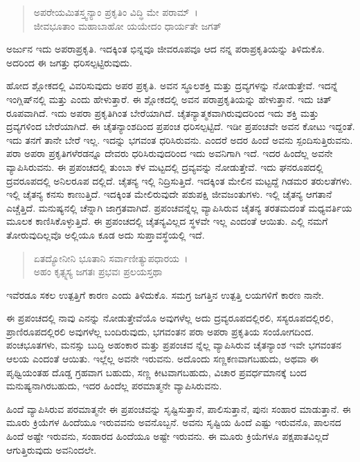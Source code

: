 \begin{verse}
ಅಪರೇಯಮಿತಸ್ತ್ವನ್ಯಾಂ ಪ್ರಕೃತಿಂ ವಿದ್ಧಿ ಮೇ ಪರಾಮ್~।\\ಜೀವಭೂತಾಂ ಮಹಾಬಾಹೋ ಯಯೇದಂ ಧಾರ್ಯತೇ ಜಗತ್ 
\end{verse}

{\small ಅರ್ಜುನ ಇದು ಅಪರಾಪ್ರಕೃತಿ. ಇದಕ್ಕಿಂತ ಭಿನ್ನವೂ ಜೀವರೂಪವೂ ಆದ ನನ್ನ ಪರಾಪ್ರಕೃತಿಯನ್ನು ತಿಳಿದುಕೊ. ಅದರಿಂದ ಈ ಜಗತ್ತು ಧರಿಸಲ್ಪಟ್ಟಿರುವುದು.}

ಹೋದ ಶ್ಲೋಕದಲ್ಲಿ ವಿವರಿಸುವುದು ಅಪರ ಪ್ರಕೃತಿ. ಅವನ ಸ್ಥೂಲಶಕ್ತಿ ಮತ್ತು ದ್ರವ್ಯಗಳನ್ನು ನೋಡುತ್ತೇವೆ. ಇದನ್ನೆ ಇಂಗ್ಲಿಷ್​ನಲ್ಲಿ  ಮತ್ತು  ಎಂದು ಹೇಳುತ್ತಾರೆ. ಈ ಶ್ಲೋಕದಲ್ಲಿ ಅವನ ಪರಾಪ್ರಕೃತಿಯನ್ನು ಹೇಳುತ್ತಾನೆ. ಇದು ಚಿತ್​ರೂಪವಾಗಿದೆ. ಇದು ಅಪರಾ ಪ್ರಕೃತಿಗಿಂತ ಬೇರೆಯಾಗಿದೆ. ಚೈತನ್ಯಾತ್ಮಕವಾಗಿರುವುದರಿಂದ ಇದು ಶಕ್ತಿ ಮತ್ತು ದ್ರವ್ಯಗಳಿಂದ ಬೇರೆಯಾಗಿದೆ. ಈ ಚೈತನ್ಯಾಂಶದಿಂದ ಪ್ರಪಂಚ ಧರಿಸಲ್ಪಟ್ಟಿದೆ. ಇಡೀ ಪ್ರಪಂಚವೇ ಅವನ ಕೋಟು ಇದ್ದಂತೆ. ಇದು ತನಗೆ ತಾನೇ ಬೇರೆ ಇಲ್ಲ. ಇದನ್ನು ಭಗವಂತ ಧರಿಸಿರುವನು. ಎಂದರೆ ಅದರ ಹಿಂದೆ ಅವನು ಸ್ಪಂದಿಸುತ್ತಿರುವನು. ಪರಾ ಅಪರಾ ಪ್ರಕೃತಿಗಳೆರಡನ್ನೂ ದೇವರು ಧರಿಸಿರುವುದರಿಂದ ಇದು ಅವನಿಗಾಗಿ ಇದೆ. ಇದರ ಹಿಂದೆಲ್ಲ ಅವನೇ ವ್ಯಾಪಿಸಿರುವನು. ಈ ಪ್ರಪಂಚದಲ್ಲಿ ತುಂಬಾ ಕೆಳ ಮಟ್ಟದಲ್ಲಿ ದ್ರವ್ಯವನ್ನು ನೋಡುತ್ತೇವೆ. ಇದು ಘನರೂಪದಲ್ಲಿ ದ್ರವರೂಪದಲ್ಲಿ ಅನಿಲರೂಪ ದಲ್ಲಿದೆ. ಚೈತನ್ಯ ಇಲ್ಲಿ ನಿದ್ರಿಸುತ್ತಿದೆ. ಇದಕ್ಕಿಂತ ಮೇಲಿನ ಮಟ್ಟದ್ದೆ ಗಿಡಮರ ತರುಲತೆಗಳು. ಇಲ್ಲಿ ಚೈತನ್ಯ ಕನಸು ಕಾಣುತ್ತಿದೆ. ಇದಕ್ಕಿಂತ ಮೇಲಿರುವುದೇ ಪಶುಪಕ್ಷಿ ಜೀವಜಂತುಗಳು. ಇಲ್ಲಿ ಚೈತನ್ಯ ಆಗತಾನೆ ಎಚ್ಚೆತ್ತಿದೆ. ಮನುಷ್ಯನಲ್ಲಿ ಚೆನ್ನಾಗಿ ಜಾಗ್ರತವಾಗಿದೆ. ಪ್ರಪಂಚವನ್ನೆಲ್ಲ ವ್ಯಾಪಿಸಿರುವ ಚೈತನ್ಯ ತರತಮದಂತೆ ಮಧ್ಯವರ್ತಿಯ ಮೂಲಕ ಕಾಣಿಸಿಕೊಳ್ಳುತ್ತಿದೆ. ಈ ಪ್ರಪಂಚದಲ್ಲಿ ಚೈತನ್ಯವಿಲ್ಲದ ಸ್ಥಳವೇ ಇಲ್ಲ ಎಂದಂತೆ ಆಯಿತು. ಎಲ್ಲಿ ನಮಗೆ ತೋರುವುದಿಲ್ಲವೊ ಅಲ್ಲಿಯೂ ಕೂಡ ಅದು ಸುಪ್ತಾವಸ್ಥೆಯಲ್ಲಿ ಇದೆ.

\begin{verse}
ಏತದ್ಯೋನೀನಿ ಭೂತಾನಿ ಸರ್ವಾಣೀತ್ಯುಪಧಾರಯ~।\\ಅಹಂ ಕೃತ್ಸ್ನಸ್ಯ ಜಗತಃ ಪ್ರಭವಃ ಪ್ರಲಯಸ್ತಥಾ 
\end{verse}

{\small ಇವೆರಡೂ ಸಕಲ ಉತ್ಪತ್ತಿಗೆ ಕಾರಣ ಎಂದು ತಿಳಿದುಕೊ. ಸಮಗ್ರ ಜಗತ್ತಿನ ಉತ್ಪತ್ತಿ ಲಯಗಳಿಗೆ ಕಾರಣ ನಾನೇ.}

ಈ ಪ್ರಪಂಚದಲ್ಲಿ ನಾವು ಎನನ್ನು ನೋಡುತ್ತೇವೆಯೊ ಅವುಗಳೆಲ್ಲ ಅದು ದ್ರವ್ಯರೂಪದಲ್ಲಿರಲಿ, ಸಸ್ಯರೂಪದಲ್ಲಿರಲಿ, ಪ್ರಾಣಿರೂಪದಲ್ಲಿರಲಿ ಅವುಗಳೆಲ್ಲ ಬಂದಿರುವುದು, ಭಗವಂತನ ಪರಾ ಅಪರಾ ಪ್ರಕೃತಿಯ ಸಂಯೋಗದಿಂದ. ಪಂಚಭೂತಗಳು, ಮನಸ್ಸು ಬುದ್ಧಿ ಅಹಂಕಾರ ಮತ್ತು ಪ್ರಪಂಚವ ನ್ನೆಲ್ಲ ವ್ಯಾಪಿಸಿರುವ ಚೈತನ್ಯಾಂಶ ಇವೇ ಭಗವಂತನ ಆಲಯ ಎಂದಂತೆ ಆಯಿತು. ಇಲ್ಲೆಲ್ಲ ಅವನೇ ಇರುವನು. ಅದೊಂದು ಸಣ್ಣಕಣವಾಗಬಹುದು, ಅಥವಾ ಈ ಪೃಥ್ವಿಯಂತಹ ದೊಡ್ಡ ಗ್ರಹವಾಗ ಬಹುದು, ಸಣ್ಣ ಕೀಟವಾಗಬಹುದು, ವಿಚಾರ ಪ್ರವರ್ಧಮಾನಕ್ಕೆ ಬಂದ ಮನುಷ್ಯನಾಗಿರಬಹುದು, ಇದರ ಹಿಂದೆಲ್ಲ ಪರಮಾತ್ಮನೇ ವ್ಯಾಪಿಸಿರುವನು.

ಹಿಂದೆ ವ್ಯಾಪಿಸಿರುವ ಪರಮಾತ್ಮನೇ ಈ ಪ್ರಪಂಚವನ್ನು ಸೃಷ್ಟಿಸುತ್ತಾನೆ, ಪಾಲಿಸುತ್ತಾನೆ, ಪುನಃ ಸಂಹಾರ ಮಾಡುತ್ತಾನೆ. ಈ ಮೂರು ಕ್ರಿಯೆಗಳ ಹಿಂದೆಯೂ ಇರುವವನು ಅವನೊಬ್ಬನೆ. ಅವನು ಸೃಷ್ಟಿಯ ಹಿಂದೆ ಎಷ್ಟು ಇರುವನೊ, ಪಾಲನದ ಹಿಂದೆ ಅಷ್ಟೇ ಇರುವನು, ಸಂಹಾರದ ಹಿಂದೆಯೂ ಅಷ್ಟೇ ಇರುವನು. ಈ ಮೂರು ಕ್ರಿಯೆಗಳೂ ಪಕ್ಷಪಾತವಿಲ್ಲದೆ ಆಗುತ್ತಿರುವುದು ಅವನಿಂದಲೇ.

